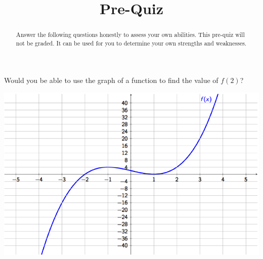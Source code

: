 \documentclass{ximera}
\title{Pre-Quiz}
\begin{document}
\begin{abstract}
Answer the following questions honestly to assess your own abilities. This pre-quiz will not be graded. It can be used for you to determine your own strengths and weaknesses.
\end{abstract}
\maketitle


\begin{question} 
    Would you be able to use the graph of a function to find the value of $f(2)$?
    
    \begin{center} \includegraphics[scale=0.7]{Graphing1.png} \end{center}

  \begin{multipleChoice}
  \end{multipleChoice}
  
\end{question}
\end{document}
